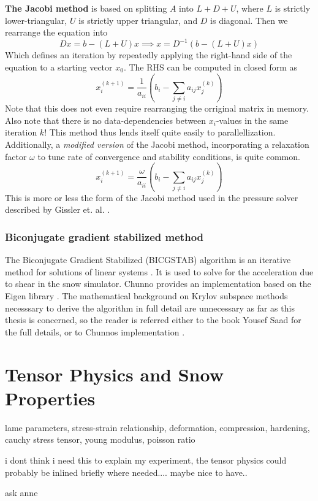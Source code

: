 {\bfseries The Jacobi method} is based on splitting $A$ into $L + D + U$, where
$L$ is strictly lower-triangular, $U$ is strictly upper triangular, and $D$ is
diagonal. \cite{young2003} Then we rearrange the equation into
$$
Dx = b - (L + U)x \implies x = D^{-1} (b - (L + U)x)
$$
Which defines an iteration by repeatedly applying the right-hand side of  the
equation to a starting vector $x_0$.
The RHS can be computed in closed form \cite{young2003} as
$$
x_i^{(k+1)} = \frac 1 {a_{ii}}\left(
    b_i - \sum_{j \neq i} a_{ij} x_j^{(k)}
\right)
$$
Note that this does not even require rearranging the orriginal matrix in memory.
Also note that there is no data-dependencies between $x_i$-values in the same
iteration $k$! This method thus lends itself quite easily to parallellization.
Additionally, a {\em modified version} of the Jacobi method, incorporating a
relaxation factor $\omega$ to tune rate of convergence and stability
conditions, is quite common.
\begin{equation}
    \label{eq:relaxed-jacobi}
x_i^{(k+1)} = \frac \omega {a_{ii}}\left(
    b_i - \sum_{j \neq i} a_{ij} x_j^{(k)}
\right)
\end{equation}
This is more or less the form of the Jacobi method used in the pressure solver described by
Gissler et. al. \cite{icsph}.

\subsubsection*{Biconjugate gradient stabilized method}
The Biconjugate Gradient Stabilized (BICGSTAB) algorithm is an iterative
method for solutions of linear systems
\cite{saad_iterative}.
It is used to solve for the acceleration due to shear in the snow simulator.
Chunno provides an implementation based on the Eigen library
\cite{chunnoo2022simulating, eigen}.
The mathematical background on Krylov subspace methods necesssary to derive
the algorithm in full detail are unnecessary as far as this thesis is concerned,
so the reader is referred either to the book Yousef Saad
\cite[p. 216]{saad_iterative}
for the full details, or to Chunnos implementation
\cite[p. 13]{chunnoo2022simulating}.

{\color{gray}
\section{Tensor Physics and Snow Properties}
\label{sec:elastiplastic}
lame parameters, stress-strain relationship,
deformation,
compression,
hardening,
cauchy stress tensor,
young modulus,
poisson ratio

i dont think i need this to explain my experiment,
the tensor physics could probably be inlined briefly where needed.... maybe nice to have..

ask anne
}



